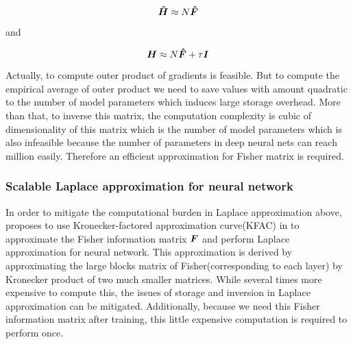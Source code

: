 \begin{equation} \label{fisher hessian}
\boldsymbol{\hat{H}} \approx N\boldsymbol{\hat{F}}
\end{equation}

and

\begin{equation} \label{fisher hessian_with_prior}
\boldsymbol H \approx N\boldsymbol{\hat F} + \tau \mathcal {\boldsymbol I}
\end{equation}

Actually, to compute outer product of gradients is feasible. But to compute the empirical average of outer product we need to save values with amount quadratic to the number of model parameters which induces large storage overhead. More than that, to inverse this matrix, the computation complexity is cubic of dimensionality of this matrix which is the number of model parameters which is also infeasible because the number of parameters in deep neural nets can reach million easily. Therefore an efficient approximation for Fisher matrix is required. 


\subsubsection{Scalable Laplace approximation for neural network}
In order to mitigate the computational burden in Laplace approximation above, \cite{ritter2018scalable} proposes to use Kronecker-factored approximation curve(KFAC) in \cite{martens2015optimizing} to approximate the Fisher information matrix $\boldsymbol F$ and perform Laplace approximation for neural network. This approximation is derived by approximating the large blocks matrix of Fisher(corresponding to each layer) by Kronecker product of two much smaller matrices. While several times more expensive to compute this, the issues of storage and inversion in Laplace approximation can be mitigated. Additionally, because we need this Fisher information matrix after training, this little expensive computation is required to perform once.

